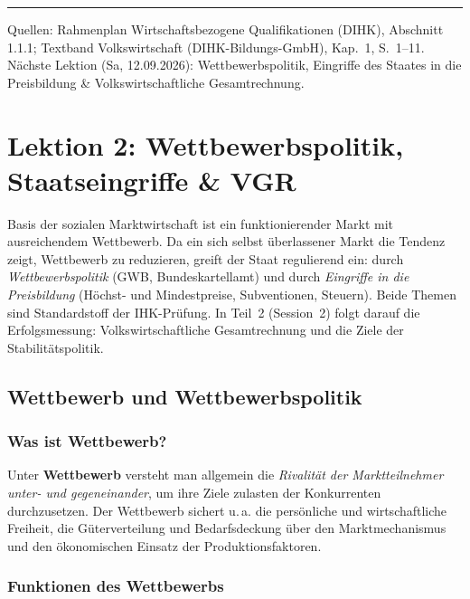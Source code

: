 \documentclass[11pt, a4paper]{article}
\begin{document}
\vspace{1em}
\hrule
\vspace{0.8em}
\noindent\textsf{\small Quellen: Rahmenplan Wirtschaftsbezogene Qualifikationen (DIHK), Abschnitt 1.1.1;
Textband Volkswirtschaft (DIHK-Bildungs-GmbH), Kap.~1, S.~1--11. Nächste Lektion (Sa, 12.09.2026):
Wettbewerbspolitik, Eingriffe des Staates in die Preisbildung \& Volkswirtschaftliche Gesamtrechnung.}
\clearpage
\section{Lektion 2: Wettbewerbspolitik, Staatseingriffe \& VGR}
\par{}\smallskip
\begin{merksatz}[title={\bfseries Worum geht es in Teil 1?}]
Basis der sozialen Marktwirtschaft ist ein funktionierender Markt mit ausreichendem
Wettbewerb. Da ein sich selbst überlassener Markt die Tendenz zeigt, Wettbewerb zu
reduzieren, greift der Staat regulierend ein: durch \emph{Wettbewerbspolitik} (GWB,
Bundeskartellamt) und durch \emph{Eingriffe in die Preisbildung} (Höchst- und
Mindestpreise, Subventionen, Steuern). Beide Themen sind Standardstoff der IHK-Prüfung.
In Teil~2 (Session~2) folgt darauf die Erfolgsmessung: Volkswirtschaftliche
Gesamtrechnung und die Ziele der Stabilitätspolitik.
\end{merksatz}



\subsection{Wettbewerb und Wettbewerbspolitik}

\subsubsection{Was ist Wettbewerb?}

Unter \textbf{Wettbewerb} versteht man allgemein die \emph{Rivalität der Marktteilnehmer
unter- und gegeneinander}, um ihre Ziele zulasten der Konkurrenten durchzusetzen. Der
Wettbewerb sichert u.\,a. die persönliche und wirtschaftliche Freiheit, die
Güterverteilung und Bedarfsdeckung über den Marktmechanismus und den ökonomischen
Einsatz der Produktionsfaktoren.

\subsubsection{Funktionen des Wettbewerbs}
\end{document}
